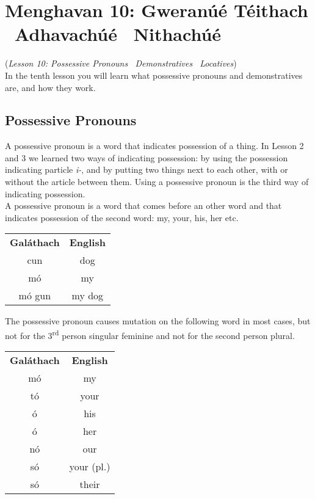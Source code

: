 \section{Menghavan 10: Gweran\'{u}\'{e} T\'{e}ithach \textemdash\ Adhavach\'{u}\'{e} \textendash\ Nithach\'{u}\'{e}}
(\textit{Lesson 10: Possessive Pronouns \textemdash\ Demonstratives \textendash\ Locatives})\\

In the tenth lesson you will learn what possessive pronouns and demonstratives are, and how they work.

\subsection{Possessive Pronouns}

A possessive pronoun is a word that indicates possession of a thing. In Lesson 2 and 3 we learned two ways of indicating possession: by using the possession indicating particle \textit{i-}, and by putting two things next to each other, with or without the article between them. Using a possessive pronoun is the third way of indicating possession.\\

A possessive pronoun is a word that comes before an other word and that indicates possession of the second word: my, your, his, her etc.
\begin{table}[H]
\centering
\begin{tabular}{cc}
  \toprule
  \textbf{Gal\'{a}thach} & \textbf{English}\\
  \cmidrule(lr){1-1}\cmidrule(lr){2-2}
  cun & dog\\
  m\'{o} & my\\
  m\'{o} gun & my dog\\
  \bottomrule
\end{tabular}
\label{examples_possessive_pronoun}
\end{table}

The possessive pronoun causes mutation on the following word in most cases, but not for the 3\textsuperscript{rd} person singular feminine and not for the second person plural.
\begin{table}[H]
\centering
\begin{tabular}{cc}
  \toprule
  \textbf{Gal\'{a}thach} & \textbf{English}\\
  \cmidrule(lr){1-1}\cmidrule(lr){2-2}
  m\'{o} & my\\
  t\'{o} & your\\
  \'{o} & his\\
  \'{o} & her\\
  n\'{o} & our\\
  s\'{o} & your (pl.)\\
  s\'{o} & their\\
  \bottomrule
\end{tabular}
\label{summary_possessive_pronoun}
\end{table}

